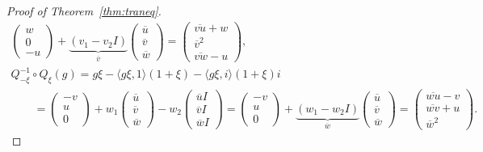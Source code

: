 \documentclass[pdftex]{sigma}
\numberwithin{equation}{section}
\begin{document}
\begin{proof}[Proof of Theorem~\ref{thm:traneq}]
\begin{gather*}
\begin{pmatrix}
 w \\ 0 \\ -u
 \end{pmatrix}+ \underbrace{(v_1-v_2I)}_{\overline{v}}
 \begin{pmatrix}
 \overline{u} \\ \overline{v} \\ \overline{w}
 \end{pmatrix}=
 \begin{pmatrix}
 \overline{vu} +w\\ \overline{v}^2 \\ \overline{vw}-u
 \end{pmatrix},\\
 Q_{-\xi}^{-1}\circ Q_\xi(g)=g \xi- \langle g \xi,1\rangle(1+\xi)- \langle g\xi ,i\rangle (1+\xi)i \\
 \qquad{}=\begin{pmatrix}
 -v \\ u \\ 0
 \end{pmatrix} + w_1
 \begin{pmatrix}
 \overline{u} \\ \overline{v} \\ \overline{w}
 \end{pmatrix}
 - w_2
 \begin{pmatrix}
 \overline{u} I \\ \overline{v} I \\ \overline{w}I
 \end{pmatrix}=
 \begin{pmatrix}
 -v \\ u \\ 0
 \end{pmatrix}+ \underbrace{(w_1-w_2I)}_{\overline{w}}
 \begin{pmatrix}
 \overline{u} \\ \overline{v} \\ \overline{w}
 \end{pmatrix}=
 \begin{pmatrix}
 \overline{wu} -v\\ \overline{wv}+u \\ \overline{w}^2
 \end{pmatrix}.
 \end{gather*}


\end{proof}
\end{document}
